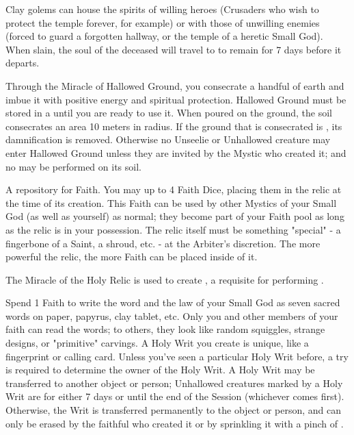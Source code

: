 Clay golems can house the spirits of willing heroes (Crusaders who wish to protect the temple forever, for example) or with those of unwilling enemies (forced to guard a forgotten hallway, or the temple of a heretic Small God).  When slain, the soul of the deceased will travel to  to remain for 7 days before it departs.

\newpage

\begin{multicols*}{2}


Through the Miracle of Hallowed Ground, you consecrate a handful of earth and imbue it with positive energy and spiritual protection. Hallowed Ground must be stored in a  until you are ready to use it. When poured on the ground, the soil consecrates an area 10 meters in radius. If the ground that is consecrated is , its damnification is removed. Otherwise no Unseelie or Unhallowed creature may enter Hallowed Ground unless they are invited by the Mystic who created it; and no  may be performed on its soil.



A repository for Faith.  You may  up to 4 Faith Dice, placing them in the relic at the time of its creation.  This Faith can be used by other Mystics of your Small God (as well as yourself) as normal; they become part of your Faith pool as long as the relic is in your possession.  The relic itself must be something "special" - a fingerbone of a Saint, a shroud, etc.  - at the Arbiter's discretion.  The more powerful the relic, the more Faith can be placed inside of it.

The Miracle of the Holy Relic is used to create , a requisite for performing .


\cbreak


Spend 1 Faith to write the word and the law of your Small God as seven sacred words on paper, papyrus, clay tablet, etc. Only you and other members of your faith can read the words; to others, they look like random squiggles, strange designs, or "primitive" carvings. A Holy Writ you create is unique, like a fingerprint or calling card. Unless you've seen a particular Holy Writ before, a  try is required to determine the owner of the Holy Writ. A Holy Writ may be transferred to another object or person; Unhallowed creatures marked by a Holy Writ are  for either 7 days or until the end of the Session (whichever comes first). Otherwise, the Writ is transferred permanently to the object or person, and can only be erased by the faithful who created it or by sprinkling it with a pinch of .



\end{multicols*}
